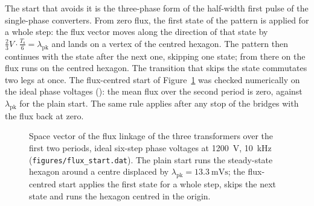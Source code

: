 \documentclass[12pt,a4paper]{scrartcl}
\newcommand{\ped}[1]{_{\mathrm{#1}}}
\newcommand{\code}[1]{\texttt{#1}}
\begin{document}
\begin{onehalfspace}
The start that avoids it is the three-phase form of the half-width first pulse of the single-phase converters. From zero flux, the first state of the pattern is applied for a whole step: the flux vector moves along the direction of that state by $\frac{2}{3} V \cdot \frac{T\ped{s}}{6} = \lambda\ped{pk}$ and lands on a vertex of the centred hexagon. The pattern then continues with the state after the next one, skipping one state; from there on the flux runs on the centred hexagon. The transition that skips the state commutates two legs at once. The flux-centred start of Figure~\ref{fig:fluxstart} was checked numerically on the ideal phase voltages (): the mean flux over the second period is zero, against $\lambda\ped{pk}$ for the plain start. The same rule applies after any stop of the bridges with the flux back at zero.

\begin{figure}[H]
	\centering
	\captionsetup{width=0.85\textwidth, font=small}
	\caption[Flux of the transformers at start-up.]{Space vector of the flux linkage of the three transformers over the first two periods, ideal six-step phase voltages at \SI{1200}{\volt}, \SI{10}{\kilo\hertz} (\code{figures/flux\_start.dat}). The plain start runs the steady-state hexagon around a centre displaced by $\lambda\ped{pk} = \SI{13.3}{\milli\volt\second}$; the flux-centred start applies the first state for a whole step, skips the next state and runs the hexagon centred in the origin.}
	\label{fig:fluxstart}
\end{figure}


\end{onehalfspace}
\end{document}

